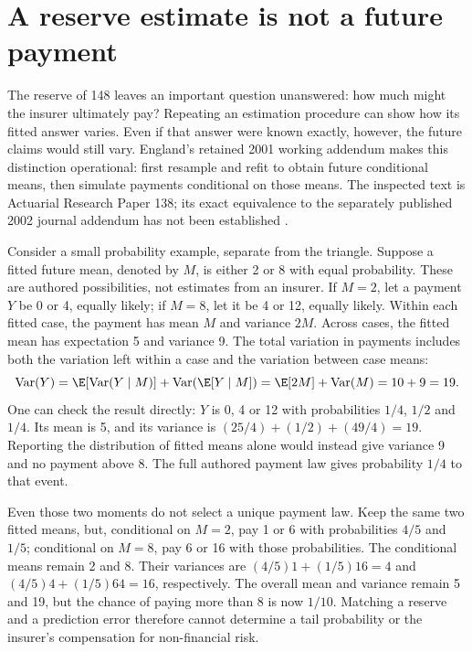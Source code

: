 \section{A reserve estimate is not a future payment}
\label{sec:reserving-bootstrap}

The reserve of 148 leaves an important question unanswered: how much might
the insurer ultimately pay? Repeating an estimation procedure can show how
its fitted answer varies. Even if that answer were known exactly, however,
the future claims would still vary. England's retained 2001 working
addendum makes this distinction operational: first resample and refit to
obtain future conditional means, then simulate payments conditional on
those means. The inspected text is Actuarial Research Paper 138; its exact
equivalence to the separately published 2002 journal addendum has not been
established \citep[Sections 2--3 and Appendix A]{england2001addendum}.

Consider a small probability example, separate from the triangle. Suppose
a fitted future mean, denoted by $M$, is either 2 or 8 with equal
probability. These are authored possibilities, not estimates from an
insurer. If $M=2$, let a payment $Y$ be 0 or 4, equally likely;
if $M=8$, let it be 4 or 12, equally likely. Within each fitted case,
the payment has mean $M$ and variance $2M$. Across cases, the fitted mean
has expectation 5 and variance 9. The total variation in payments includes
both the variation left within a case and the variation between case means:
\[
 \operatorname{Var}(Y)
 =\E\!\left[\operatorname{Var}(Y\mid M)\right]
  +\operatorname{Var}\!\left(\E[Y\mid M]\right)
 =\E[2M]+\operatorname{Var}(M)=10+9=19.
\]
One can check the result directly: $Y$ is 0, 4 or 12 with probabilities
$1/4$, $1/2$ and $1/4$. Its mean is 5, and its variance is
$(25/4)+(1/2)+(49/4)=19$. Reporting the distribution of fitted means
alone would instead give variance 9 and no payment above 8. The full
authored payment law gives probability $1/4$ to that event.

Even those two moments do not select a unique payment law. Keep the same
two fitted means, but, conditional on $M=2$, pay 1 or 6 with probabilities
$4/5$ and $1/5$; conditional on $M=8$, pay 6 or 16 with those probabilities.
The conditional means remain 2 and 8. Their variances are
$(4/5)1+(1/5)16=4$ and $(4/5)4+(1/5)64=16$, respectively.
The overall mean and variance remain 5 and 19, but the chance of paying
more than 8 is now $1/10$. Matching a reserve and a prediction error
therefore cannot determine a tail probability or the insurer's compensation
for non-financial risk.

